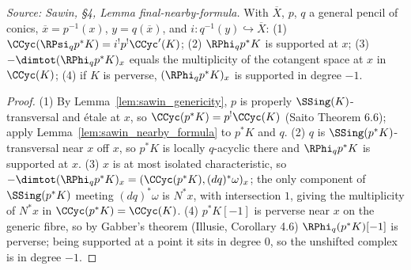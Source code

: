 \begin{lemma}
  \label{lem:sawin_final_nearby_formula}
  \textit{Source: Sawin, §4, Lemma final-nearby-formula.}
  With $\overline X$, $p$, $q$ a general pencil of conics, $\overline x=p^{-1}(x)$,
  $y=q(\overline x)$, and $i:q^{-1}(y)\hookrightarrow\overline X$:
  (1) $\CCyc(\RPsi_q p^*K)=i^!p^!\CCyc'(K)$;
  (2) $\RPhi_q p^*K$ is supported at $x$;
  (3) $-\dimtot(\RPhi_q p^*K)_x$ equals the multiplicity of the cotangent space at
  $x$ in $\CCyc(K)$;
  (4) if $K$ is perverse, $(\RPhi_q p^*K)_x$ is supported in degree $-1$.
\end{lemma}
\begin{proof}
  (1) By Lemma~\ref{lem:sawin_genericity}, $p$ is properly $\SSing(K)$-transversal
  and étale at $x$, so $\CCyc(p^*K)=p^!\CCyc(K)$ (Saito Theorem 6.6); apply
  Lemma~\ref{lem:sawin_nearby_formula} to $p^*K$ and $q$.
  (2) $q$ is $\SSing(p^*K)$-transversal near $x$ off $x$, so $p^*K$ is locally
  $q$-acyclic there and $\RPhi_q p^*K$ is supported at $x$.
  (3) $x$ is at most isolated characteristic, so
  $-\dimtot(\RPhi_q p^*K)_x = (\CCyc(p^*K),(dq)^*\omega)_x$; the only component of
  $\SSing(p^*K)$ meeting $(dq)^*\omega$ is $N^*x$, with intersection $1$, giving
  the multiplicity of $N^*x$ in $\CCyc(p^*K)=\CCyc(K)$.
  (4) $p^*K[-1]$ is perverse near $x$ on the generic fibre, so by Gabber's theorem
  (Illusie, Corollary 4.6) $\RPhi_q(p^*K)[-1]$ is perverse; being supported at a
  point it sits in degree $0$, so the unshifted complex is in degree $-1$.
\end{proof}

